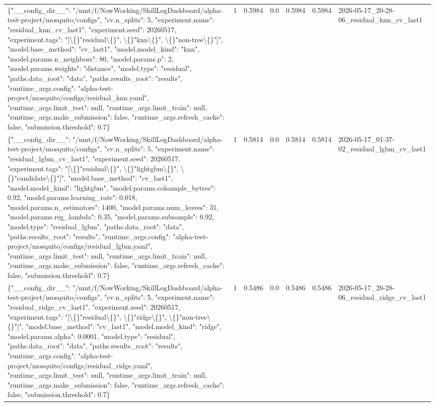 \begin{tabular}{lllllll}
\{"\_\_config\_dir\_\_": "/mnt/f/NowWorking/SkillLogDashboard/alpha-test-project/mosquito/configs", "cv.n\_splits": 5, "experiment.name": "residual\_knn\_cv\_last1", "experiment.seed": 20260517, "experiment.tags": "[\textbackslash\{\}"residual\textbackslash\{\}", \textbackslash\{\}"knn\textbackslash\{\}", \textbackslash\{\}"non-tree\textbackslash\{\}"]", "model.base\_method": "cv\_last1", "model.model\_kind": "knn", "model.params.n\_neighbors": 80, "model.params.p": 2, "model.params.weights": "distance", "model.type": "residual", "paths.data\_root": "data", "paths.results\_root": "results", "runtime\_args.config": "alpha-test-project/mosquito/configs/residual\_knn.yaml", "runtime\_args.limit\_test": null, "runtime\_args.limit\_train": null, "runtime\_args.make\_submission": false, "runtime\_args.refresh\_cache": false, "submission.threshold": 0.7\} & 1 & 0.5984 & 0.0 & 0.5984 & 0.5984 & 2026-05-17\_20-28-06\_residual\_knn\_cv\_last1 \\
\{"\_\_config\_dir\_\_": "/mnt/f/NowWorking/SkillLogDashboard/alpha-test-project/mosquito/configs", "cv.n\_splits": 5, "experiment.name": "residual\_lgbm\_cv\_last1", "experiment.seed": 20260517, "experiment.tags": "[\textbackslash\{\}"residual\textbackslash\{\}", \textbackslash\{\}"lightgbm\textbackslash\{\}", \textbackslash\{\}"candidate\textbackslash\{\}"]", "model.base\_method": "cv\_last1", "model.model\_kind": "lightgbm", "model.params.colsample\_bytree": 0.92, "model.params.learning\_rate": 0.018, "model.params.n\_estimators": 1400, "model.params.num\_leaves": 31, "model.params.reg\_lambda": 0.35, "model.params.subsample": 0.92, "model.type": "residual\_lgbm", "paths.data\_root": "data", "paths.results\_root": "results", "runtime\_args.config": "alpha-test-project/mosquito/configs/residual\_lgbm.yaml", "runtime\_args.limit\_test": null, "runtime\_args.limit\_train": null, "runtime\_args.make\_submission": false, "runtime\_args.refresh\_cache": false, "submission.threshold": 0.7\} & 1 & 0.5814 & 0.0 & 0.5814 & 0.5814 & 2026-05-17\_01-37-02\_residual\_lgbm\_cv\_last1 \\
\{"\_\_config\_dir\_\_": "/mnt/f/NowWorking/SkillLogDashboard/alpha-test-project/mosquito/configs", "cv.n\_splits": 5, "experiment.name": "residual\_ridge\_cv\_last1", "experiment.seed": 20260517, "experiment.tags": "[\textbackslash\{\}"residual\textbackslash\{\}", \textbackslash\{\}"ridge\textbackslash\{\}", \textbackslash\{\}"non-tree\textbackslash\{\}"]", "model.base\_method": "cv\_last1", "model.model\_kind": "ridge", "model.params.alpha": 0.0001, "model.type": "residual", "paths.data\_root": "data", "paths.results\_root": "results", "runtime\_args.config": "alpha-test-project/mosquito/configs/residual\_ridge.yaml", "runtime\_args.limit\_test": null, "runtime\_args.limit\_train": null, "runtime\_args.make\_submission": false, "runtime\_args.refresh\_cache": false, "submission.threshold": 0.7\} & 1 & 0.5486 & 0.0 & 0.5486 & 0.5486 & 2026-05-17\_20-28-06\_residual\_ridge\_cv\_last1 \\
\end{tabular}
